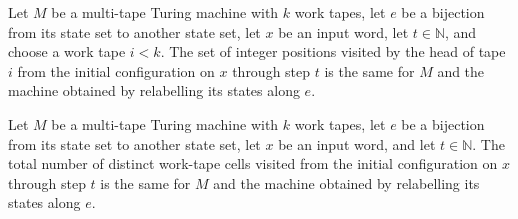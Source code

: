 \begin{theorem}
\label{Turing.MultiTapeTM.relabelState_visitedByTapeHead}
\leanok
{}
Let $M$ be a multi-tape Turing machine with $k$ work tapes, let $e$ be a bijection from
its state set to another state set, let $x$ be an input word, let $t\in\mathbb{N}$, and
choose a work tape $i<k$. The set of integer positions visited by the head of tape $i$
from the initial configuration on $x$ through step $t$ is the same for $M$ and the
machine obtained by relabelling its states along $e$.
\end{theorem}

\begin{theorem}
\label{Turing.MultiTapeTM.relabelState_spaceUsed}
\leanok
{}
Let $M$ be a multi-tape Turing machine with $k$ work tapes, let $e$ be a bijection from
its state set to another state set, let $x$ be an input word, and let $t\in\mathbb{N}$.
The total number of distinct work-tape cells visited from the initial configuration on
$x$ through step $t$ is the same for $M$ and the machine obtained by relabelling its
states along $e$.
\end{theorem}

